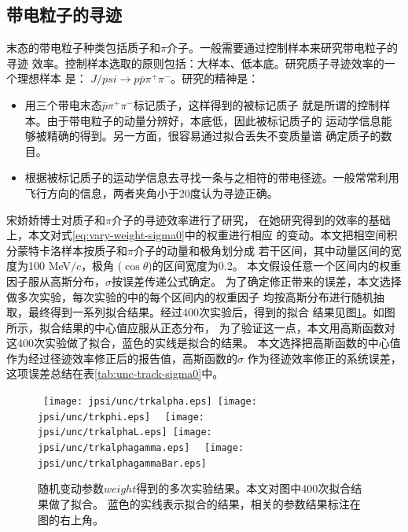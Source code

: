 \subsection{带电粒子的寻迹}%
\label{sec:Tracking-unc-sigma0}
末态的带电粒子种类包括质子和$\pi$介子。一般需要通过控制样本来研究带电粒子的寻迹
效率。控制样本选取的原则包括：大样本、低本底。研究质子寻迹效率的一个理想样本
是：
$J/psi \to p \bar{p} \pi^{+} \pi^{-}$。研究的精神是：
\begin{itemize}
    \item 用三个带电末态$\bar{p} \pi^{+} \pi^{-}$标记质子，这样得到的被标记质子
        就是所谓的控制样本。由于带电粒子的动量分辨好，本底低，因此被标记质子的
        运动学信息能够被精确的得到。另一方面，很容易通过拟合丢失不变质量谱
        确定质子的数目。
    \item 根据被标记质子的运动学信息去寻找一条与之相符的带电径迹。一般常常利用
        飞行方向的信息，两者夹角小于20度认为寻迹正确。
\end{itemize}
宋娇娇博士对质子和$\pi$介子的寻迹效率进行了研究\cite{PID:jiaojiao}，
在她研究得到的效率的基础上，本文对式\ref{eq:vary-weight-sigma0}中的权重进行相应
的变动。本文把相空间积分蒙特卡洛样本按质子和$\pi$介子的动量和极角划分成
若干区间，其中动量区间的宽度为100 MeV$/c$，极角 ($\cos\theta$)的区间宽度为0.2。
本文假设任意一个区间内的权重因子服从高斯分布，$\sigma$按误差传递公式确定。
为了确定修正带来的误差，本文选择做多次实验，每次实验的中的每个区间内的权重因子
均按高斯分布进行随机抽取，最终得到一系列拟合结果。经过400次实验后，得到的拟合
结果见图\ref{fig:fit-value-track}。如图所示，拟合结果的中心值应服从正态分布，
为了验证这一点，本文用高斯函数对这400次实验做了拟合，蓝色的实线是拟合的结果。
本文选择把高斯函数的中心值作为经过径迹效率修正后的报告值，高斯函数的$\sigma$
作为径迹效率修正的系统误差，这项误差总结在表\ref{tab:unc-track-sigma0}中。

\begin{figure}[htbp]
    \centering
    \mbox{%
        \texttt{[image: jpsi/unc/trkalpha.eps]}
        \texttt{[image: jpsi/unc/trkphi.eps]}
    }
    \mbox{%
        \texttt{[image: jpsi/unc/trkalphaL.eps]}
        \texttt{[image: jpsi/unc/trkalphagamma.eps]}
    }
    \mbox{%
        \texttt{[image: jpsi/unc/trkalphagammaBar.eps]}
    }
    \caption{%
        随机变动参数$weight$得到的多次实验结果。本文对图中400次拟合结果做了拟合。
        蓝色的实线表示拟合的结果，相关的参数结果标注在图的右上角。
    }%
    \label{fig:fit-value-track}
\end{figure}


